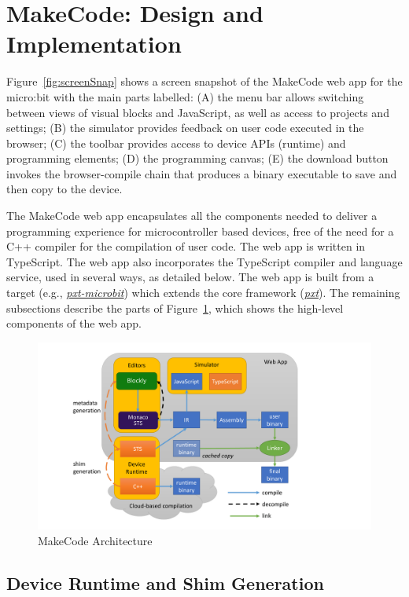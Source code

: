 \section{MakeCode: Design and Implementation}
\label{sec:makecode}

Figure~\ref{fig:screenSnap} shows a screen snapshot of the MakeCode web app for the micro:bit
with the main parts labelled: (A) the menu bar allows switching between views of visual blocks
and JavaScript, as well as access to projects and settings; (B) the simulator provides feedback on user code executed in the browser;
(C) the toolbar provides access to device APIs (runtime) and programming elements;
(D) the programming canvas; (E) the download button invokes the browser-compile chain that
produces a binary executable to save and then copy to the device.

The MakeCode web app encapsulates all the components needed to deliver a programming experience 
for microcontroller based devices, free of the need for a C++ compiler for the compilation of user 
code.
The web app is written in TypeScript. The web app also incorporates the TypeScript compiler and 
language service, used in several ways, as detailed below. 
The web app is built from a target (e.g., \emph{\href{https://github.com/microsoft/pxt-microbit}{pxt-microbit}})
which extends the core framework (\emph{\href{https://github.com/microsoft/pxt}{pxt}}).
The remaining subsections describe the parts of Figure~\ref{fig:makecode}, 
which shows the high-level components of the web app.

\begin{figure}[t]
    \includegraphics[width=5.5in]{makecodeFig.pdf}
\caption{\label{fig:makecode}MakeCode Architecture}
\end{figure}

\subsection{Device Runtime and Shim Generation}

